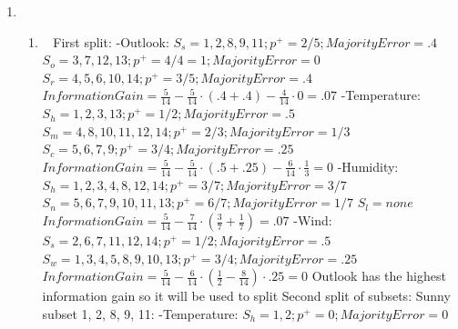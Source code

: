 \documentclass[12pt, fullpage,letterpaper]{article}
\begin{document}
\begin{enumerate}
\begin{enumerate}
`\end{enumerate}
\item~ 
\begin{enumerate}
	\item~
	\newline First split:
	\newline -Outlook:
	\newline $S_s = 1, 2,8, 9, 11; p^+=2/5; Majority Error=.4$
	\newline $S_o=3, 7, 12, 13; p^+=4/4 = 1; Majority Error=0$
	\newline $S_r=4, 5, 6, 10, 14; p^+=3/5; Majority Error=.4$
	\newline $Information Gain=\frac{5}{14}-\frac{5}{14}\cdot (.4+.4)-\frac{4}{14} \cdot 0 = .07$
	\newline -Temperature:
	\newline $S_h = 1, 2, 3, 13; p^+=1/2; Majority Error=.5$
	\newline $S_m=4, 8, 10, 11, 12, 14; p^+=2/3; Majority Error=1/3$
	\newline $S_c=5, 6, 7, 9; p^+=3/4; Majority Error=.25$
	\newline $Information Gain=\frac{5}{14}-\frac{5}{14}\cdot (.5+.25)-\frac{6}{14} \cdot \frac{1}{3} = 0$
	\newline -Humidity:
	\newline $S_h = 1, 2, 3, 4, 8, 12, 14; p^+=3/7; Majority Error=3/7$
	\newline $S_n=5, 6, 7, 9, 10, 11, 13; p^+=6/7; Majority Error=1/7$
	\newline $S_l=none$
	\newline $Information Gain=\frac{5}{14}-\frac{7}{14}\cdot (\frac{3}{7}+\frac{1}{7}) = .07$
	\newline -Wind:
	\newline $S_s = 2, 6, 7, 11, 12, 14; p^+=1/2; Majority Error=.5$
	\newline $S_w=1, 3, 4, 5, 8, 9, 10, 13; p^+=3/4; Majority Error=.25$
	\newline $Information Gain=\frac{5}{14}-\frac{6}{14}\cdot (\frac{1}{2}-\frac{8}{14}) \cdot .25 = 0$
	\newline Outlook has the highest information gain so it will be used to split
	\newline
	\newline Second split of subsets:
	\newline Sunny subset 1, 2, 8, 9, 11:
	\newline -Temperature:
	\newline $S_h = 1, 2; p^+=0; Majority Error=0$

\end{enumerate}
\end{enumerate}
\end{document}
